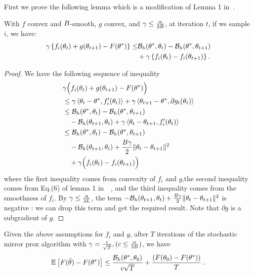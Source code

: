 \begin{subappendices}
First we prove the following lemma which is a modification of Lemma 1 in~\citep{duchi2010composite}. 
\begin{lemma}
\label{apdx:lem:mirr_prox_upbnd}
With $f$  convex and $B$-smooth, $g$  convex, and $\gamma \leq \frac{\alpha}{3B}$, at iteration $t$, if we sample $i$, we have: 
\begin{align*}
\gamma\left\{ f_i(\theta_t) + g(\theta_{t+1}) - F(\theta^*) \right\} \leq & {\mathcal B}_{h}(\theta^*,\theta_t) - {\mathcal B}_{h}(\theta^*,\theta_{t+1})\\ &+ \gamma \left\{ f_i(\theta_t) - f_i(\theta_{t+1}) \right\}. 
\end{align*}
\end{lemma}
\begin{proof}
   We have the following sequence of inequality 
   \begin{align*}
        &\gamma\Big( f_i(\theta_t) +  g(\theta_{t+1}) - F(\theta^*) \Big) \\  
        & \leq \gamma \left < \theta_t - \theta^*, f_i'(\theta_{t}) \right> + \gamma \left < \theta_{t+1} - \theta^*, \partial g_t(\theta_{t}) \right> \\ 
        & \leq {\mathcal B}_{h}(\theta^*,\theta_t) - {\mathcal B}_{h}(\theta^*,\theta_{t+1}) \\
        & \quad - {\mathcal B}_{h}(\theta_{t+1}, \theta_t) + \gamma \left < \theta_t - \theta_{t+1}, f_i'(\theta_{t}) \right>\\
        & \leq {\mathcal B}_{h}(\theta^*,\theta_t) - {\mathcal B}_{h}(\theta^*,\theta_{t+1}) \\
        & \quad  - {\mathcal B}_{h}(\theta_{t+1}, \theta_t) + \frac{B \gamma}{2} \|\theta_t - \theta_{t+1}\|^2 \\
        & \quad +\gamma \Big( f_i(\theta_t) - f_i(\theta_{t+1}) \Big)\\
    \end{align*}
    where the first inequality comes from convexity of $f_i$ and $g$,the second inequality comes from Eq.(6) of lemma 1 in~~\citep{duchi2010composite}, and the third inequality comes from
    the smoothness of $f_i$. By $\gamma \leq \frac{\alpha}{3L}$, the term $- {\mathcal B}_{h}(\theta_{t+1},\theta_{t}) + \frac{B \gamma}{2} \|\theta_t - \theta_{t+1}\|^2$ is negative : we can drop this term and get the required result. Note that $\partial g$ is a subgradient of $g$.
\end{proof}

\begin{theorem}
Given the above assumptions for $f_i$ and $g$, after $T$ iterations of the stochastic mirror prox algorithm with $\gamma = \frac{c}{\sqrt{T}},(c\leq \frac{\alpha}{3B})$, we have 
\[
    \mathbb{E}_{} \left[ F(\bar{\theta}) - F(\theta^*)  \right]  \leq \frac{{\mathcal B}_{h}(\theta^*,\theta_0)}{c \sqrt{T}} + \frac{(F(\theta_0) - F(\theta^*))}{T} \; .
\]
\end{theorem}


\end{subappendices}
